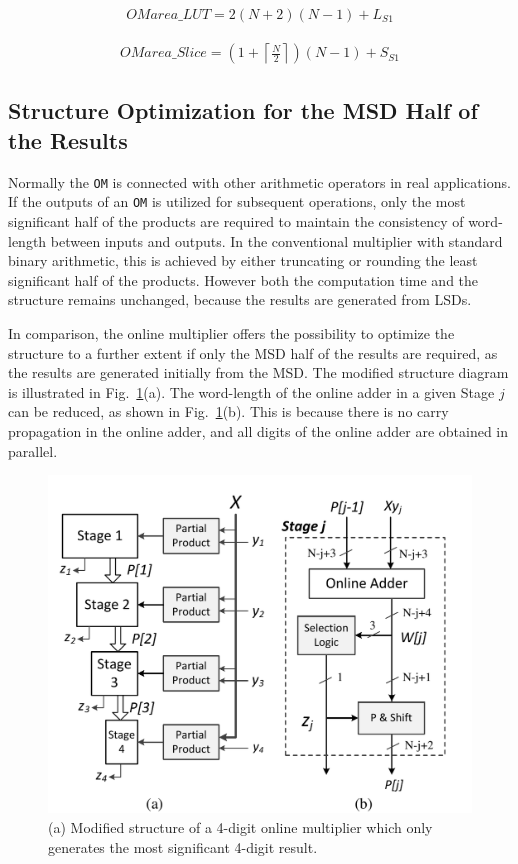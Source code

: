 \documentclass[conference]{IEEEtran}
\begin{document}
\begin{eqnarray}\label{Eq:OMareaLUT}
	OMarea\_{LUT} = 2(N+2)(N-1) + {L}_{S1}
\end{eqnarray}

\begin{eqnarray}\label{Eq:OMareaSlice}
	OMarea\_{Slice} = (1+\left\lceil{\frac{N}{2}}\right\rceil)(N-1)+S_{S1}
\end{eqnarray}

\subsection{Structure Optimization for the MSD Half of the Results}

Normally the \texttt{OM} is connected with other arithmetic operators in real applications. If the outputs of an \texttt{OM} is utilized for subsequent operations, only the most significant half of the products are required to maintain the consistency of word-length between inputs and outputs. In the conventional multiplier with standard binary arithmetic, this is achieved by either truncating or rounding the least significant half of the products. However both the computation time and the structure remains unchanged, because the results are generated from LSDs.

In comparison, the online multiplier offers the possibility to optimize the structure to a further extent if only the MSD half of the results are required, as the results are generated initially from the MSD. The modified structure diagram is illustrated in Fig.~\ref{Fig:PMStructure_MSDhalf}(a). The word-length of the online adder in a given Stage $j$ can be reduced, as shown in Fig.~\ref{Fig:PMStructure_MSDhalf}(b). This is because there is no carry propagation in the online adder, and all digits of the online adder are obtained in parallel.

\begin{figure}[tbp]
	\centering
	\includegraphics[width=.5\textwidth]{./Figures/ParallelMult_MSDhalf.pdf}
	\caption{(a) Modified structure of a 4-digit online multiplier which only generates the most significant 4-digit result. }
	\label{Fig:PMStructure_MSDhalf}
\end{figure}
\end{document}
